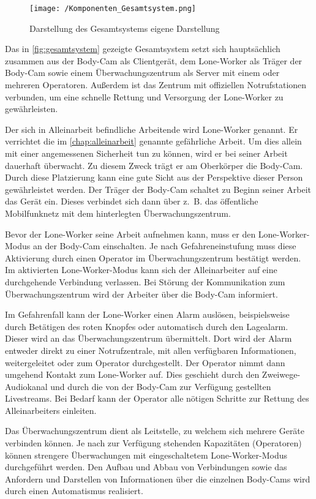 \documentclass[thesis.tex]{subfiles}
\begin{document}
\begin{figure}[h]
    \centering
    \texttt{[image: /Komponenten\_Gesamtsystem.png]}
    \caption[Darstellung des Gesamtsystems]{Darstellung des Gesamtsystems \lbrack eigene Darstellung\rbrack}
    \label{fig:gesamtsystem}
\end{figure}

Das in \autoref{fig:gesamtsystem} gezeigte Gesamtsystem setzt sich hauptsächlich zusammen aus der Body-Cam als Clientgerät, dem Lone-Worker
als Träger der Body-Cam sowie einem Überwachungszentrum als Server mit einem oder mehreren Operatoren.
Außerdem ist das Zentrum mit offiziellen Notrufstationen verbunden, um eine schnelle Rettung und Versorgung der Lone-Worker zu gewährleisten.

Der sich in Alleinarbeit befindliche Arbeitende wird Lone-Worker genannt.
Er verrichtet die im \autoref{chap:alleinarbeit} genannte gefährliche Arbeit.
Um dies allein mit einer angemessenen Sicherheit tun zu können, wird er bei seiner Arbeit dauerhaft überwacht.
Zu diesem Zweck trägt er am Oberkörper die Body-Cam.
Durch diese Platzierung kann eine gute Sicht aus der Perspektive dieser Person gewährleistet werden.
Der Träger der Body-Cam schaltet zu Beginn seiner Arbeit das Gerät ein.
Dieses verbindet sich dann über z.~B. das öffentliche Mobilfunknetz mit dem hinterlegten Überwachungszentrum.

Bevor der Lone-Worker seine Arbeit aufnehmen kann, muss er den Lone-Worker-Modus an der Body-Cam einschalten.
Je nach Gefahreneinstufung muss diese Aktivierung durch einen Operator im Überwachungszentrum bestätigt werden.
Im aktivierten Lone-Worker-Modus kann sich der Alleinarbeiter auf eine durchgehende Verbindung verlassen.
Bei Störung der Kommunikation zum Überwachungszentrum wird der Arbeiter über die Body-Cam informiert.

Im Gefahrenfall kann der Lone-Worker einen Alarm auslösen, beispielsweise durch Betätigen des roten Knopfes oder automatisch durch den Lagealarm.
Dieser wird an das Überwachungszentrum übermittelt.
Dort wird der Alarm entweder direkt zu einer Notrufzentrale, mit allen verfügbaren Informationen, weitergeleitet oder zum Operator durchgestellt.
Der Operator nimmt dann umgehend Kontakt zum Lone-Worker auf.
Dies geschieht durch den Zweiwege-Audiokanal und durch die von der Body-Cam zur Verfügung gestellten Livestreams.
Bei Bedarf kann der Operator alle nötigen Schritte zur Rettung des Alleinarbeiters einleiten.

Das Überwachungszentrum dient als Leitstelle, zu welchem sich mehrere Geräte verbinden können.
Je nach zur Verfügung stehenden Kapazitäten (Operatoren) können strengere Überwachungen mit eingeschaltetem Lone-Worker-Modus durchgeführt werden.
Den Aufbau und Abbau von Verbindungen sowie das Anfordern und Darstellen von Informationen über die einzelnen Body-Cams wird
durch einen Automatismus realisiert.
\end{document}
